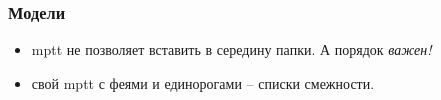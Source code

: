\begin{frame}
  \frametitle{Модели}

  \begin{itemize}
  \item mptt не позволяет вставить в середину папки. А порядок \emph{важен!}
  \item свой mptt с феями и единорогами -- списки смежности.
  \end{itemize}

  \pause

\end{frame}
